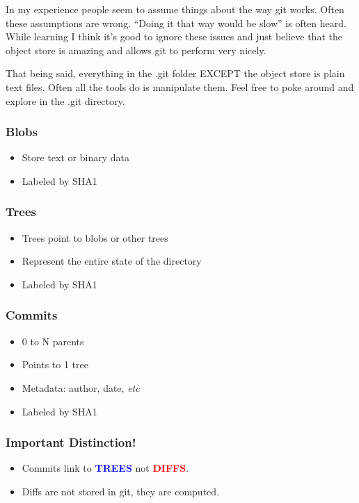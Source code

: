 In my experience people seem to assume things about the way git works. Often
these assumptions are wrong. ``Doing it that way would be slow'' is often
heard. While learning I think it's good to ignore these issues and just believe
that the object store is amazing and allows git to perform very nicely.

That being said, everything in the .git folder EXCEPT the object store is plain
text files. Often all the tools do is manipulate them. Feel free to poke around
and explore in the .git directory.

\begin{frame}
  \frametitle{Blobs}
  \begin{itemize}
  \item Store text or binary data
  \item Labeled by SHA1
  \end{itemize}
\end{frame}

\begin{frame}
  \frametitle{Trees}
  \begin{itemize}
  \item Trees point to blobs or other trees
  \item Represent the entire state of the directory
  \item Labeled by SHA1
  \end{itemize}
\end{frame}

\begin{frame}
  \frametitle{Commits}
  \begin{itemize}
  \item 0 to N parents
  \item Points to 1 tree
  \item Metadata: author, date, \textit{etc}
  \item Labeled by SHA1
  \end{itemize}
\end{frame}

\begin{frame}
  \frametitle{Important Distinction!}
  \begin{itemize}
  \item Commits link to \textcolor{blue}{\textbf{TREES}} not \textcolor{red}{\textbf{DIFFS}}.
  \item Diffs are not stored in git, they are computed.
  \end{itemize}
\end{frame}

